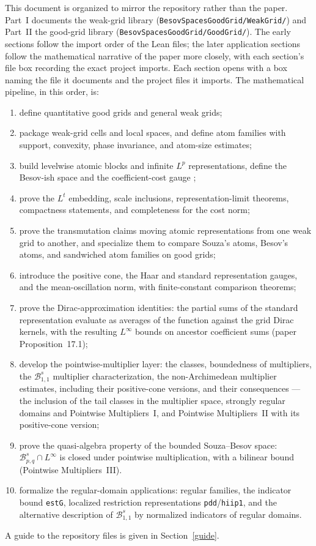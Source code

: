 \documentclass[11pt]{amsart}
\theoremstyle{definition}
\newcommand{\lean}[1]{\ifmmode\mbox{\leanname{#1}}\else\hspace{0pt}\leanname{#1}\fi}
\begin{document}
This document is organized to mirror the repository rather than the paper.
Part~I documents the weak-grid library
(\texttt{BesovSpacesGoodGrid/WeakGrid/}) and Part~II the good-grid library
(\texttt{BesovSpacesGoodGrid/GoodGrid/}).  The early sections follow the
import order of the Lean files; the later application sections follow the
mathematical narrative of the paper more closely, with each section's file
box recording the exact project imports. Each section opens with a box naming
the file it documents and the project files it imports.
The mathematical pipeline, in this order, is:
\begin{enumerate}
  \item define quantitative good grids and general weak grids;
  \item package weak-grid cells and local spaces, and define atom families
    with support, convexity, phase invariance, and atom-size estimates;
  \item build levelwise atomic blocks and infinite $L^p$ representations,
    define the Besov-ish space and the coefficient-cost gauge
    \lean{Norm\_Costpq};
  \item prove the $L^t$ embedding, scale inclusions, representation-limit
    theorems, compactness statements, and completeness for the cost norm;
  \item prove the transmutation claims moving atomic representations from one
    weak grid to another, and specialize them to compare Souza's atoms, Besov's
    atoms, and sandwiched atom families on good grids;
  \item introduce the positive cone, the Haar and standard representation
    gauges, and the mean-oscillation norm, with finite-constant comparison
    theorems;
  \item prove the Dirac-approximation identities: the partial sums of the
    standard representation evaluate as averages of the function against the
    grid Dirac kernels, with the resulting $L^\infty$ bounds on ancestor
    coefficient sums (paper Proposition~17.1);
  \item develop the pointwise-multiplier layer: the \lean{selfs} classes,
    boundedness of \lean{selfs} multipliers, the $\mathcal{B}^s_{1,1}$
    multiplier characterization, the non-Archimedean multiplier estimates,
    including their positive-cone versions, and their consequences --- the
    inclusion of the tail \lean{selfs} classes in the multiplier space,
    strongly regular domains and Pointwise Multipliers~I, and Pointwise
    Multipliers~II with its positive-cone version;
  \item prove the quasi-algebra property of the bounded Souza--Besov space:
    $\mathcal{B}^s_{p,q} \cap L^\infty$ is closed under pointwise
    multiplication, with a bilinear bound (Pointwise Multipliers~III).
  \item formalize the regular-domain applications: regular families, the
    indicator bound \texttt{estG}, localized restriction representations
    \texttt{pdd}/\texttt{hiip1}, and the alternative description of
    $\mathcal{B}^s_{1,1}$ by normalized indicators of regular domains.
\end{enumerate}
A guide to the repository files is given in Section~\ref{guide}.
\end{document}

